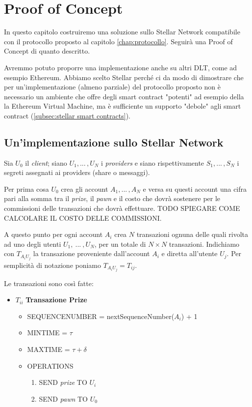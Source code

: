 \chapter{Proof of Concept}

In questo capitolo costruiremo una soluzione sullo Stellar Network
compatibile con il protocollo proposto al capitolo \ref{chap:protocollo}.
Seguirà una Proof of Concept di quanto descritto.

Avremmo potuto proporre una
implementazione anche su altri DLT, come ad esempio Ethereum. Abbiamo scelto
Stellar perché ci da modo di dimostrare che per un'implementazione (almeno parziale)
del protocollo proposto non è necessario un ambiente che
offre degli smart contract "potenti" ad esempio
della la Ethereum Virtual Machine,
ma è sufficiente un supporto
"debole" agli smart contract (\ref{subsec:stellar smart contracts}).


\section{Un'implementazione sullo Stellar Network}
Sia $ U_0 $ il \textit{client};
siano $ U_1, ...\, , U_N $ i \textit{providers} e
siano rispettivamente $ S_1, ...\, , S_N $ i segreti assegnati ai providers
(share o messaggi).

Per prima cosa $ U_0 $ crea gli account $ A_1, ...\, , A_N $ e
versa su questi account una cifra pari alla somma tra
il \textit{prize}, il \textit{pawn} e il costo che dovrà sostenere per le commissioni
delle transazioni che dovrà effettuare.
TODO SPIEGARE COME CALCOLARE IL COSTO DELLE COMMISSIONI.

A questo punto per ogni account $ A_i $ crea $ N $ transazioni
ognuna delle quali rivolta ad uno degli utenti $ U_1,\ ...\ , U_N $, per un totale
di $ N \times N $ transazioni. Indichiamo con $ T_{{A_i}{U_j}} $ la transazione
proveniente dall'account $ A_i $ e diretta all'utente $ U_j $.
Per semplicità di notazione poniamo $ T_{{A_i}{U_j}} = T_{ij} $.

Le transazioni sono così fatte:
\begin{itemize}
	\item $T_{ii} $ \textbf{Transazione Prize}
	      \begin{itemize}
		      \item SEQUENCE\textunderscore NUMBER = nextSequenceNumber($ A_i $) + 1
		      \item MIN\textunderscore TIME = $ \tau $
		      \item MAX\textunderscore TIME = $ \tau + \delta $
		      \item OPERATIONS
		            \begin{enumerate}
			            \item SEND \textit{prize} TO $ U_i $
			            \item SEND \textit{pawn} TO $ U_0 $
		            \end{enumerate}
	      \end{itemize}
\end{itemize}

